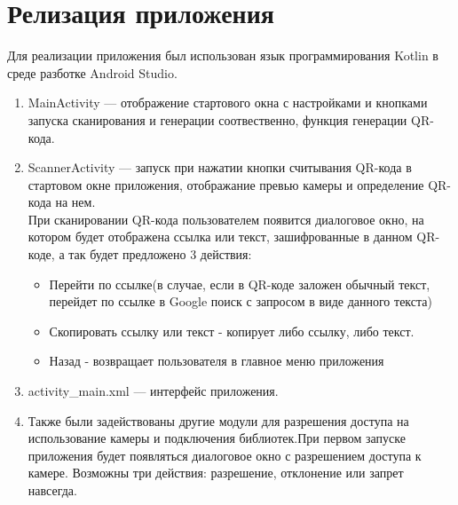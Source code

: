 \documentclass[a4paper,12pt]{article}
\begin{document}
\section{Релизация приложения}
Для реализации приложения был использован язык программирования Kotlin в среде разботке Android Studio.
    \begin{enumerate}
        \item MainActivity --- отображение стартового окна с настройками и кнопками запуска сканирования и генерации соотвественно, функция генерации QR-кода.
        \item ScannerActivity ---  запуск при нажатии кнопки считывания QR-кода в стартовом окне приложения, отображание превью камеры и определение QR-кода на нем.\\
        При сканировании QR-кода пользователем появится диалоговое окно,
        на котором будет отображена ссылка или текст, зашифрованные в данном QR-коде,
        а так будет предложено 3 действия:
    \begin{itemize}
        \item Перейти по ссылке(в случае, если в QR-коде заложен обычный текст,
        перейдет по ссылке в Google поиск с запросом в виде данного текста)
        \item Скопировать ссылку или текст - копирует либо ссылку, либо текст.
        \item Назад - возвращает пользователя в главное меню приложения
    \end{itemize}
        \item activity\_main.xml --- интерфейс приложения.
        \item Также были задействованы другие модули для разрешения доступа на использование камеры и подключения библиотек.При первом запуске приложения будет появляться диалоговое окно с разрешением доступа к камере. Возможны три действия: разрешение, отклонение или запрет навсегда.
    \end{enumerate}


\end{document}
